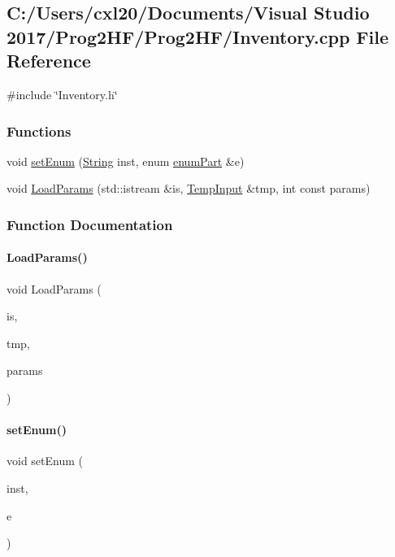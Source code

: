 \subsection{C\+:/\+Users/cxl20/\+Documents/\+Visual Studio 2017/\+Prog2\+H\+F/\+Prog2\+H\+F/\+Inventory.cpp File Reference}
\label{_inventory_8cpp}
{\ttfamily \#include \char`\"{}Inventory.\+h\char`\"{}}\newline
\subsubsection*{Functions}
\begin{DoxyCompactItemize}
\item 
void \mbox{\hyperlink{_inventory_8cpp_a60723589ed29abbba810d129e72f21ed}{set\+Enum}} (\mbox{\hyperlink{class_string}{String}} inst, enum \mbox{\hyperlink{_inventory_8h_abddff37837f171d72a2e16a1448a3943}{enum\+Part}} \&e)
\item 
void \mbox{\hyperlink{_inventory_8cpp_a027b287b99619c750f30b4765ec929e5}{Load\+Params}} (std\+::istream \&is, \mbox{\hyperlink{struct_temp_input}{Temp\+Input}} \&tmp, int const params)
\end{DoxyCompactItemize}


\subsubsection{Function Documentation}
\mbox{\label{_inventory_8cpp_a027b287b99619c750f30b4765ec929e5}} 
\paragraph{\texorpdfstring{LoadParams()}{LoadParams()}}
{\footnotesize\ttfamily void Load\+Params (\begin{DoxyParamCaption}\item[{std\+::istream \&}]{is,  }\item[{\mbox{\hyperlink{struct_temp_input}{Temp\+Input}} \&}]{tmp,  }\item[{int const}]{params }\end{DoxyParamCaption})}

\mbox{\label{_inventory_8cpp_a60723589ed29abbba810d129e72f21ed}} 
\paragraph{\texorpdfstring{setEnum()}{setEnum()}}
{\footnotesize\ttfamily void set\+Enum (\begin{DoxyParamCaption}\item[{\mbox{\hyperlink{class_string}{String}}}]{inst,  }\item[{enum \mbox{\hyperlink{_inventory_8h_abddff37837f171d72a2e16a1448a3943}{enum\+Part}} \&}]{e }\end{DoxyParamCaption})}

